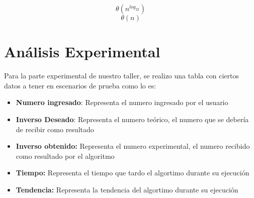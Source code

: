 \documentclass[letter]{article}
\begin{document}
\[\theta(n^{log_22})\]
\[\theta(n)\]

\section{Análisis Experimental}
Para la parte experimental de nuestro taller, se realizo una tabla con ciertos datos a tener en escenarios de prueba como lo es:
\begin{itemize}
    \item \textbf{Numero ingresado}: Representa el numero ingresado por el usuario
    \item\textbf{Inverso Deseado}: Representa el numero teórico, el numero que se debería de recibir como resultado
    \item\textbf{Inverso obtenido: }Representa el numero experimental, el numero recibido como resultado por el algoritmo
    \item\textbf{Tiempo: }Representa el tiempo que tardo el algortimo durante su ejecución
    \item\textbf{Tendencia: }Representa la tendencia del algortimo durante su ejecución\\
\end{itemize}
\end{document}
